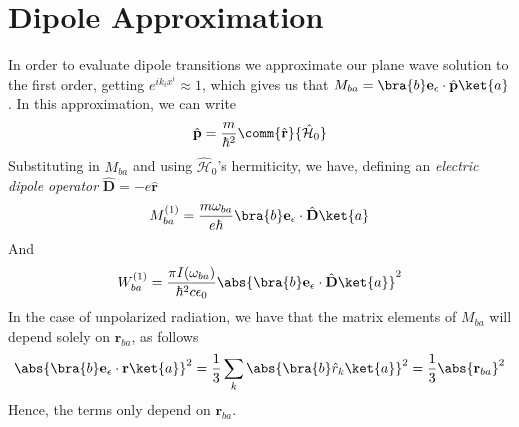 \documentclass[a4paper, 11pt]{book}
\renewcommand{\vec}[1]{\mathbf{#1}}
\newcommand{\ver}[1]{\vec{e}_{#1}}
\newcommand{\1}{\opr{\mathds{1}}}
\newcommand{\ham}{\mathcal{H}}
\newcommand{\opr}[1]{\hat{#1}}
\newcommand{\vecopr}[1]{\opr{\vec{#1}}}
\theoremstyle{plain}
\begin{document}
	\section{Dipole Approximation}
	In order to evaluate dipole transitions we approximate our plane wave solution to the first order, getting $e^{ik_ix^i}\approx1$, which gives us that $M_{ba}=\bra{b}\ver{\epsilon}\cdot\vecopr{p}\ket{a}$. In this approximation, we can write
	\begin{equation*}
		\vecopr{p}=\frac{m}{\hbar^2}\comm{\vecopr{r}}{\opr{\ham}_0}
	\end{equation*}
	Substituting in $M_{ba}$ and using $\opr{\ham}_0$'s hermiticity, we have, defining an \textit{electric dipole operator} $\vecopr{D}=-e\vecopr{r}$
	\begin{equation}
		M_{ba}^{(1)}=\frac{m\omega_{ba}}{e\hbar}\bra{b}\ver{\epsilon}\cdot\vecopr{D}\ket{a}
		\label{eq:mbadipole}
	\end{equation}
	And
	\begin{equation}
		W_{ba}^{(1)}=\frac{\pi I(\omega_{ba})}{\hbar^2c\epsilon_0}\abs{\bra{b}\ver{\epsilon}\cdot\vecopr{D}\ket{a}}^2
		\label{eq:transprobdipole}
	\end{equation}
	In the case of unpolarized radiation, we have that the matrix elements of $M_{ba}$ will depend solely on $\vec{r}_{ba}$, as follows
	\begin{equation}
		\abs{\bra{b}\ver{\epsilon}\cdot\vec{r}\ket{a}}^2=\frac{1}{3}\sum_k\abs{\bra{b}\opr{r}_k\ket{a}}^2=\frac{1}{3}\abs{\vec{r}_{ba}}^2
		\label{eq:mbadipoletransunpol}
	\end{equation}
	Hence, the terms only depend on $\vec{r}_{ba}$.
\end{document}

